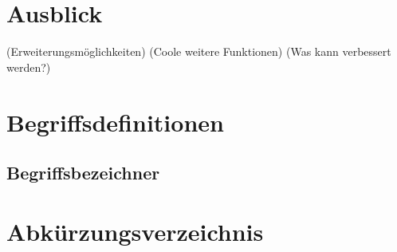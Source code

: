 \documentclass[
    load-dhbw-templates,
    load-preamble = true,
    auto-intro-pages = all,
    add-tocs-to-toc,
    debug = true,
    language = english,
    mainlanguage = ngerman,
    add-bibliography,
    bib-file = dhbw-source.bib,
    biblatex/style = numeric,
    print- = false
]{iodhbwm}
\begin{document}
\chapter{Ausblick}
    (Erweiterungsmöglichkeiten)
    (Coole weitere Funktionen)
    (Was kann verbessert werden?)

\appendix


\chapter{Begriffsdefinitionen}

\section{Begriffsbezeichner} \label{sec:Begriffsbezeichner}




\chapter{Abkürzungsverzeichnis}



\end{document}
